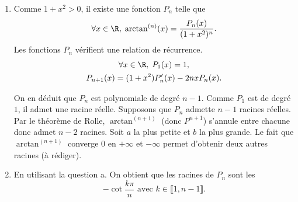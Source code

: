 \begin{enumerate}
 \item Comme $1+x^2 >0$, il existe une fonction $P_n$ telle que 
\begin{displaymath}
 \forall x \in \R, \; \arctan^{(n)}(x) =
\frac{P_n(x)}{(1+x^2)^n}.
\end{displaymath}
Les fonctions $P_n$ vérifient une relation de récurrence.
\begin{multline*}
 \forall x\in \R, \; P_1(x) = 1, \\
P_{n+1}(x) = (1+x^2)P'_n(x) - 2nxP_n(x).
\end{multline*}

On en déduit que $P_n$ est polynomiale de degré $n-1$.\newline
Comme $P_1$ est de degré $1$, il admet une racine réelle. Supposons que $P_n$ admette $n-1$ racines réelles. Par le théorème de Rolle, $\arctan^{(n+1)}$ (donc $P^{n+1}$) s'annule entre chacune donc admet $n-2$ racines. Soit $a$ la plus petite et $b$ la plus grande. Le fait que $\arctan^{(n+1)}$ converge $0$ en $+\infty$ et $-\infty$ permet d'obtenir deux autres racines (à rédiger).
 
 \item En utilisant la question a. On obtient que les racines de $P_n$ sont les 
\begin{displaymath}
 -\cot \frac{k\pi}{n} \text{ avec } k \in \llbracket 1, n-1 \rrbracket.
\end{displaymath}

\end{enumerate}
